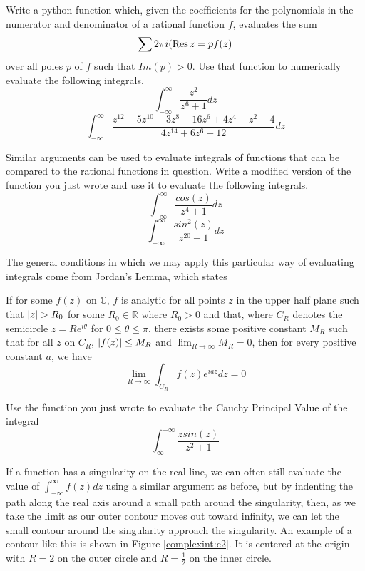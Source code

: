 \begin{problem}
Write a python function which, given the coefficients for the polynomials in the numerator and denominator of a rational function $f$, evaluates the sum
\begin{equation*}
\sum 2\pi i (\operatorname{Res}{z=p} f(z)
\end{equation*}
over all poles $p$ of $f$ such that $Im(p)>0$.
Use that function to numerically evaluate the following integrals.
$$\int_{-\infty}^{\infty} \frac{z^2}{z^6+1}dz$$
$$\int_{-\infty}^{\infty} \frac{z^{12}-5z^{10}+3z^8-16z^6+4z^4-z^2-4}{4z^{14}+6z^6+12}dz$$
\end{problem}

\begin{problem}
Similar arguments can be used to evaluate integrals of functions that can be compared to the rational functions in question.
Write a modified version of the function you just wrote and use it to evaluate the following integrals.
$$\int_{-\infty}^{\infty}\frac{cos(z)}{z^4+1}dz$$
$$\int_{-\infty}^{\infty}\frac{sin^2(z)}{z^{20}+1}dz$$
\end{problem}

The general conditions in which we may apply this particular way of evaluating integrals come from Jordan's Lemma, which states
\begin{lemma}
If for some $f(z)$ on $\mathbb{C}$, $f$ is analytic for all points $z$ in the upper half plane such that $\left\lvert z\right\rvert>R_0$ for some $R_0 \in \mathbb{R}$ where $R_0 >0$ and that, where $C_R$ denotes the semicircle $z=Re^{i\theta}$ for $0\leq \theta \leq \pi$, there exists some positive constant $M_R$ such that for all $z$ on $C_R$, $\left\lvert f(z)\right\rvert \leq M_R$ and $\lim_{R \to \infty} M_R = 0$, then for every positive constant $a$, we have
$$\lim_{R \to \infty} \int_{C_R} f(z) e^{iaz} dz = 0$$
\end{lemma}
\begin{problem}
Use the function you just wrote to evaluate the Cauchy Principal Value of the integral
$$\int_{\infty}^{-\infty} \frac{z sin(z)}{z^2+1}$$
\end{problem}

If a function has a singularity on the real line, we can often still evaluate the value of $\int_{-\infty}^{\infty} f(z) dz$ using a similar argument as before, but by indenting the path along the real axis around a small path around the singularity, then, as we take the limit as our outer contour moves out toward infinity, we can let the small contour around the singularity approach the singularity.
An example of a contour like this is shown in Figure \ref{complexint:c2}.
It is centered at the origin with $R=2$ on the outer circle and $R=\frac{1}{2}$ on the inner circle.

